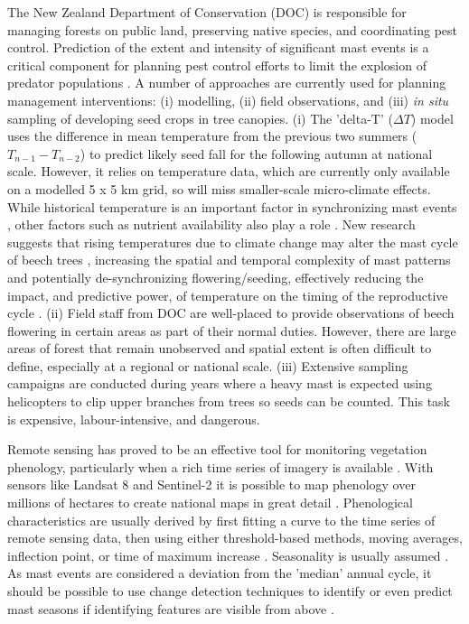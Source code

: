\documentclass[remotesensing,article,submit,moreauthors,pdftex]{Definitions/mdpi}
\begin{document}
The New Zealand Department of Conservation (DOC) is responsible for managing forests on public land, preserving native species, and coordinating pest control. Prediction of the extent and intensity of significant mast events is a critical component for planning pest control efforts to limit the explosion of predator populations \citep{Elliott2016}. A number of approaches are currently used for planning management interventions: (i) modelling, (ii) field observations, and (iii) \emph{in situ} sampling of developing seed crops in tree canopies. (i) The 'delta-T' ($\Delta{T}$) model \citep{Kelly2013} uses the difference in mean temperature from the previous two summers ($T_{n-1} - T_{n-2}$) to predict likely seed fall for the following autumn at national scale. However, it relies on temperature data, which are currently only available on a modelled 5 x 5 km grid, so will miss smaller-scale micro-climate effects. While historical temperature is an important factor in synchronizing mast events \citep{Kelly2013}, other factors such as nutrient availability also play a role \citep{Allen2014}. New research suggests that rising temperatures due to climate change may alter the mast cycle of beech trees \citep{Bogdziewicz2020,Allen2014}, increasing the spatial and temporal complexity of mast patterns \citep{Allen2014} and potentially de-synchronizing flowering/seeding, effectively reducing the impact, and predictive power, of temperature on the timing of the reproductive cycle \citep{Bogdziewicz2021}. (ii) Field staff from DOC are well-placed to provide observations of beech flowering in certain areas as part of their normal duties. However, there are large areas of forest that remain unobserved and spatial extent is often difficult to define, especially at a regional or national scale. (iii) Extensive sampling campaigns are conducted during years where a heavy mast is expected using helicopters to clip upper branches from trees
so seeds can be counted. This task is expensive, labour-intensive, and dangerous. 

Remote sensing has proved to be an effective tool for monitoring vegetation phenology, particularly when a rich time series of imagery is available \citep{Bolton2020,Misra2020,Zeng2020,Dixon2021,Moon2021MODIS,Moon2021Multiscale}. With sensors like Landsat 8 and Sentinel-2 it is possible to map phenology over millions of hectares to create national maps in great detail \citep{Bolton2020,Browning2021}. Phenological characteristics are usually derived by first fitting a curve to the time series of remote sensing data, then using either threshold-based methods, moving averages, inflection point, or time of maximum increase \citep{Atkinson2012,Marcos2015,Cheng2020,Garcia2021,Noumonvi2021}. Seasonality is usually assumed \citep{Noumonvi2021}. As mast events are considered a deviation from the 'median' annual cycle, it should be possible to use change detection techniques \citep{Asokan2019,Panuju2020} to identify or even predict mast seasons if identifying features are visible from above \citep{Marcos2015,Dixon2021,Garcia2021}. 
\end{document}
